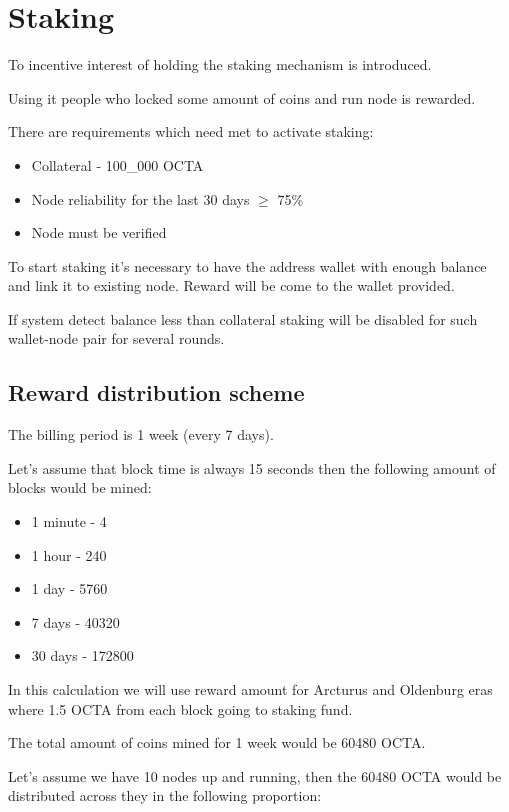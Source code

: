 \section{Staking}
\label{sec:staking}

To incentive interest of holding the staking mechanism is introduced.

Using it people who locked some amount of coins and run node is rewarded.

There are requirements which need met to activate staking:

\begin{itemize}
    \item Collateral - 100\_000 OCTA
    \item Node reliability for the last 30 days $\ge$ 75\%
    \item Node must be verified
\end{itemize}

To start staking it's necessary to have the address wallet with enough balance and link it to existing node.
Reward will be come to the wallet provided.

If system detect balance less than collateral staking will be disabled for such wallet-node pair for
several rounds.

\subsection{Reward distribution scheme}

The billing period is 1 week (every 7 days).

Let's assume that block time is always 15 seconds then the following amount of blocks would be mined:

\begin{itemize}
    \item 1 minute - 4
    \item 1 hour - 240
    \item 1 day - 5760
    \item 7 days - 40320
    \item 30 days - 172800
\end{itemize}

In this calculation we will use reward amount for Arcturus and Oldenburg eras where 1.5 OCTA from each block going to staking fund.

The total amount of coins mined for 1 week would be 60480 OCTA.

Let’s assume we have 10 nodes up and running, then the 60480 OCTA would be distributed across they in the following proportion:

